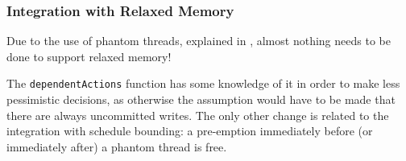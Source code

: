 \subsubsection{Integration with Relaxed Memory}
\label{sec:sct-por-relaxed}

Due to the use of phantom threads, explained in
, almost nothing needs to be done to
support relaxed memory!

The \verb|dependentActions| function has some knowledge of it in order
to make less pessimistic decisions, as otherwise the assumption would
have to be made that there are always uncommitted writes. The only
other change is related to the integration with schedule bounding: a
pre-emption immediately before (or immediately after) a phantom thread
is free.
